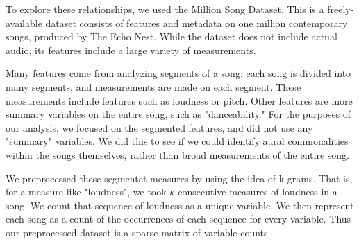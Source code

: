 To explore these relationships, we used the Million Song Dataset.
This is a freely-available dataset consists of features and metadata on one million contemporary songs,
produced by The Echo Nest.
While the dataset does not include actual audio,
its features include a large variety of measurements.

Many features come from analyzing segments of a song:
each song is divided into many segments, and measurements are made on each segment.
These measurements include features such as loudness or pitch.
Other features are more summary variables on the entire song, such as "danceability."
For the purposes of our analysis, we focused on the segmented features,
and did not use any "summary" variables.
We did this to see if we could identify aural commonalities within the songs themselves,
rather than broad measurements of the entire song.

We preprocessed these segmentet measures by using the idea of k-grams.
That is, for a measure like "loudness", we took $k$ consecutive measures of loudness
in a song.
We count that sequence of loudness as a unique variable.
We then represent each song as a count of the occurrences of each sequence for every variable.
Thus our preprocessed dataset is a sparse matrix of variable counts.

